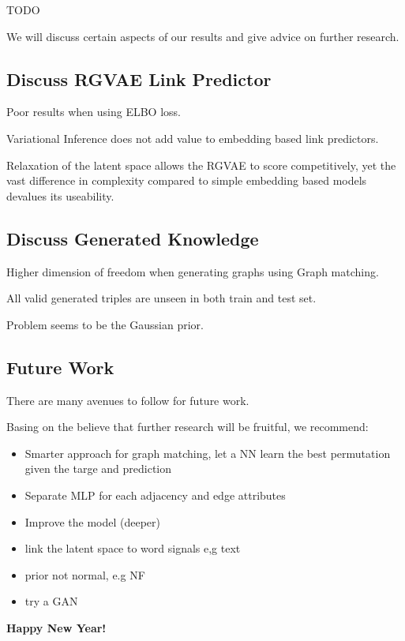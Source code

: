 
TODO

We will discuss certain aspects of our results and give advice on further research.

\subsection{Discuss RGVAE Link Predictor}


Poor results when using ELBO loss.

Variational Inference does not add value to embedding based link predictors.

Relaxation of the latent space allows the RGVAE to score competitively, yet the vast difference in complexity compared to simple embedding based models devalues its useability. 

\subsection{Discuss Generated Knowledge}

Higher dimension of freedom when generating graphs using Graph matching.

All valid generated triples are unseen in both train and test set. 

Problem seems to be the Gaussian prior.

\subsection{Future Work}

There are many avenues to follow for future work.

Basing on the believe that further research will be fruitful, we recommend:

\begin{itemize}
    \item Smarter approach for graph matching, let a NN learn the best permutation given the targe and prediction
    \item Separate MLP for each adjacency and edge attributes
    \item Improve the model (deeper)
    \item link the latent space to word signals e,g text
    \item prior not normal, e.g NF
    \item try a GAN
\end{itemize}


\textbf{Happy New Year!}
